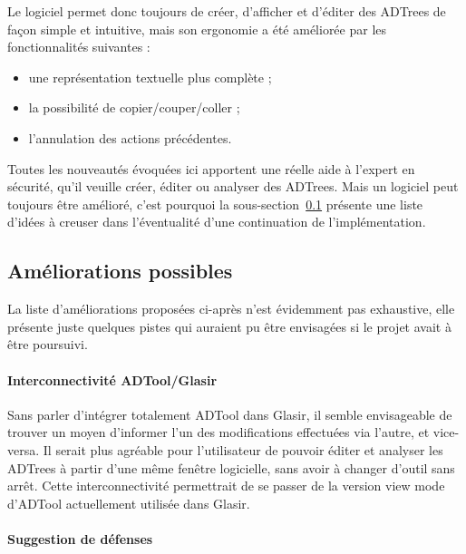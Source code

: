 Le logiciel permet donc toujours de créer, d'afficher et d'éditer des ADTrees de façon simple et intuitive, mais son ergonomie a été améliorée par les fonctionnalités suivantes :
\begin{itemize}
	\item une représentation textuelle plus complète ;
	\item la possibilité de copier/couper/coller ;
	\item l'annulation des actions précédentes.
\end{itemize}

Toutes les nouveautés évoquées ici apportent une réelle aide à l'expert en sécurité, qu'il veuille créer, éditer ou analyser des ADTrees. Mais un logiciel peut toujours être amélioré, c'est pourquoi la {\sc sous-section}~\ref{subsec:encorePlusMieux} présente une liste d'idées à creuser dans l'éventualité d'une continuation de l'implémentation.

\subsection{Améliorations possibles}
\label{subsec:encorePlusMieux}

La liste d'améliorations proposées ci-après n'est évidemment pas exhaustive, elle présente juste quelques pistes qui auraient pu être envisagées si le projet avait à être poursuivi.

\paragraph{Interconnectivité ADTool/Glasir} Sans parler d'intégrer totalement ADTool dans Glasir, il semble envisageable de trouver un moyen d'informer l'un des modifications effectuées via l'autre, et vice-versa. Il serait plus agréable pour l'utilisateur de pouvoir éditer et analyser les ADTrees à partir d'une même fenêtre logicielle, sans avoir à changer d'outil sans arrêt. Cette interconnectivité permettrait de se passer de la version \og view mode \fg{} d'ADTool actuellement utilisée dans Glasir. 

\paragraph{Suggestion de défenses}